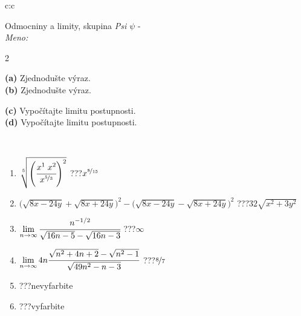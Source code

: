 \documentclass[10pt]{report}
\begin{document}
\begin{tabular}{c:c}
\begin{minipage}[c][104.5mm][t]{0.5\linewidth}
\begin{center}
\vspace{7mm}
{\huge Odmocniny a limity, skupina \textit{Psi $\psi$} -}\\[5mm]
\textit{Meno:}\phantom{xxxxxxxxxxxxxxxxxxxxxxxxxxxxxxxxxxxxxxxxxxxxxxxxxxxxxxxxxxxxxxxxx}\\[5mm]
\begin{minipage}{0.95\linewidth}
\begin{center}
{\small \begin{multicols}{2} \raggedright
\textbf{(a)} Zjednodušte výraz. \\[1mm]
\textbf{(b)} Zjednodušte výraz. \par \columnbreak
\textbf{(c)} Vypočítajte limitu postupnosti. \\[1mm]
\textbf{(d)} Vypočítajte limitu postupnosti.
\end{multicols}
}
\end{center}
\end{minipage}
\\[4mm]
\begin{minipage}{0.79\linewidth}
\begin{center}
\begin{varwidth}{\linewidth}
\begin{enumerate}
\small
\item $\sqrt[5]{\left(\cfrac{x^{1}\;x^{2}}{x^{\nicefrac{5}{3}}}\right)^{2}}$\quad \dotfill\; ???\;\dotfill \quad $x^{\nicefrac{8}{15}}$
\item {\footnotesize{\scriptsize$\big(\sqrt{8x-24y}+\sqrt{8x+24y}\big)^2-\big(\sqrt{8x-24y}-\sqrt{8x+24y}\big)^2$}\quad \dotfill\; ???\;\dotfill \quad $32\sqrt{x^2+3y^2}$}
\item $\lim\limits_{n\to\infty}\cfrac{n^{-1/2}}{\sqrt{16n-5}-\sqrt{16n-3}}$\quad \dotfill\; ???\;\dotfill \quad $\infty$
\item $\lim\limits_{n\to\infty}4n\cfrac{\sqrt{n^2+4n+2}-\sqrt{n^2-1}}{\sqrt{49n^2-n-3}}$\quad \dotfill\; ???\;\dotfill \quad $\nicefrac{8}{7}$
\item \quad \dotfill\; ???\;\dotfill \quad nevyfarbite
\item \quad \dotfill\; ???\;\dotfill \quad vyfarbite
\end{enumerate}
\end{varwidth}
\end{center}
\end{minipage}

\end{center}
\end{minipage}
\end{tabular}
\end{document}
